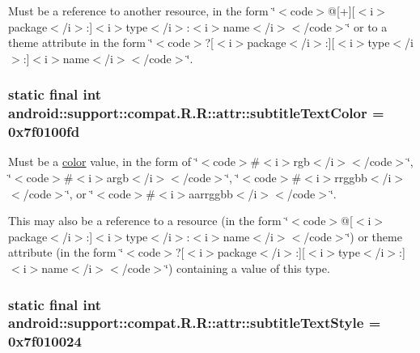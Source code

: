 Must be a reference to another resource, in the form \char`\"{}$<$code$>$@\mbox{[}+\mbox{]}\mbox{[}$<$i$>$package$<$/i$>$:\mbox{]}$<$i$>$type$<$/i$>$:$<$i$>$name$<$/i$>$$<$/code$>$\char`\"{} or to a theme attribute in the form \char`\"{}$<$code$>$?\mbox{[}$<$i$>$package$<$/i$>$:\mbox{]}\mbox{[}$<$i$>$type$<$/i$>$:\mbox{]}$<$i$>$name$<$/i$>$$<$/code$>$\char`\"{}. \hypertarget{classandroid_1_1support_1_1compat_1_1_r_1_1attr_b99d19e45287c49d1fc71c414a4b4c08}{
\subsubsection[{subtitleTextColor}]{\setlength{\rightskip}{0pt plus 5cm}static final int android::support::compat.R.R::attr::subtitleTextColor = 0x7f0100fd}}
\label{classandroid_1_1support_1_1compat_1_1_r_1_1attr_b99d19e45287c49d1fc71c414a4b4c08}


Must be a \hyperlink{classandroid_1_1support_1_1compat_1_1_r_1_1color}{color} value, in the form of \char`\"{}$<$code$>$\#$<$i$>$rgb$<$/i$>$$<$/code$>$\char`\"{}, \char`\"{}$<$code$>$\#$<$i$>$argb$<$/i$>$$<$/code$>$\char`\"{}, \char`\"{}$<$code$>$\#$<$i$>$rrggbb$<$/i$>$$<$/code$>$\char`\"{}, or \char`\"{}$<$code$>$\#$<$i$>$aarrggbb$<$/i$>$$<$/code$>$\char`\"{}. 

This may also be a reference to a resource (in the form \char`\"{}$<$code$>$@\mbox{[}$<$i$>$package$<$/i$>$:\mbox{]}$<$i$>$type$<$/i$>$:$<$i$>$name$<$/i$>$$<$/code$>$\char`\"{}) or theme attribute (in the form \char`\"{}$<$code$>$?\mbox{[}$<$i$>$package$<$/i$>$:\mbox{]}\mbox{[}$<$i$>$type$<$/i$>$:\mbox{]}$<$i$>$name$<$/i$>$$<$/code$>$\char`\"{}) containing a value of this type. \hypertarget{classandroid_1_1support_1_1compat_1_1_r_1_1attr_86d1d89a0e51209ec94382af1f1fda93}{
\subsubsection[{subtitleTextStyle}]{\setlength{\rightskip}{0pt plus 5cm}static final int android::support::compat.R.R::attr::subtitleTextStyle = 0x7f010024}}
\label{classandroid_1_1support_1_1compat_1_1_r_1_1attr_86d1d89a0e51209ec94382af1f1fda93}


